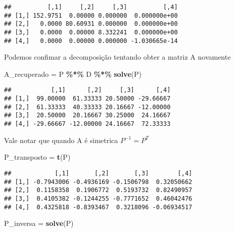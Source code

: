 \documentclass[
]{article}
\newenvironment{Shaded}{\begin{snugshade}}{\end{snugshade}}
\newcommand{\FunctionTok}[1]{\textcolor[rgb]{0.13,0.29,0.53}{\textbf{#1}}}
\newcommand{\NormalTok}[1]{#1}
\newcommand{\OtherTok}[1]{\textcolor[rgb]{0.56,0.35,0.01}{#1}}
\newcommand{\SpecialCharTok}[1]{\textcolor[rgb]{0.81,0.36,0.00}{\textbf{#1}}}
\begin{document}
\begin{Shaded}
\end{Shaded}

\begin{verbatim}
##          [,1]     [,2]     [,3]          [,4]
## [1,] 152.9751  0.00000 0.000000  0.000000e+00
## [2,]   0.0000 80.60931 0.000000  0.000000e+00
## [3,]   0.0000  0.00000 8.332241  0.000000e+00
## [4,]   0.0000  0.00000 0.000000 -1.030665e-14
\end{verbatim}

Podemos confimar a decomposição tentando obter a matriz A novamente

\begin{Shaded}
\begin{Highlighting}[]
\NormalTok{A\_recuperado }\OtherTok{=}\NormalTok{ P }\SpecialCharTok{\%*\%}\NormalTok{ D }\SpecialCharTok{\%*\%} \FunctionTok{solve}\NormalTok{(P)}
\end{Highlighting}
\end{Shaded}

\begin{verbatim}
##           [,1]      [,2]     [,3]      [,4]
## [1,]  99.00000  61.33333 20.50000 -29.66667
## [2,]  61.33333  40.33333 20.16667 -12.00000
## [3,]  20.50000  20.16667 30.25000  24.16667
## [4,] -29.66667 -12.00000 24.16667  72.33333
\end{verbatim}

Vale notar que quando A é simetrica \(P^{-1} = P^{T}\)

\begin{Shaded}
\begin{Highlighting}[]
\NormalTok{P\_transposto }\OtherTok{=} \FunctionTok{t}\NormalTok{(P)}
\end{Highlighting}
\end{Shaded}

\begin{verbatim}
##            [,1]       [,2]       [,3]        [,4]
## [1,] -0.7943006 -0.4936169 -0.1506798  0.32050662
## [2,]  0.1158358  0.1906772  0.5193732  0.82490957
## [3,]  0.4105382 -0.1244255 -0.7771652  0.46042476
## [4,]  0.4325818 -0.8393467  0.3218096 -0.06934517
\end{verbatim}

\begin{Shaded}
\begin{Highlighting}[]
\NormalTok{P\_inversa }\OtherTok{=} \FunctionTok{solve}\NormalTok{(P)}
\end{Highlighting}
\end{Shaded}
\end{document}
